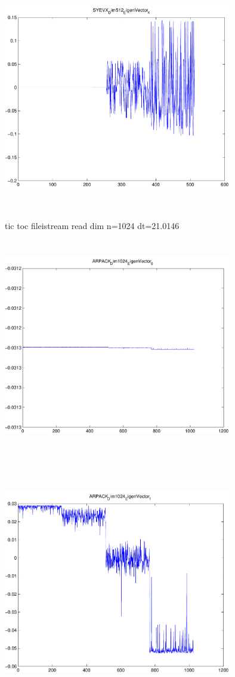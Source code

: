 \documentclass[9pt]{article}
\theoremstyle{plain}
\theoremstyle{definition}
\theoremstyle{remark}
\numberwithin{equation}{section}
\begin{document}
\includegraphics[width=10.0cm,height=10.0cm]{SYEVX_Dim512_EigenVector_4.pdf}

tic toc fileistream read dim n=1024 dt=21.0146
\includegraphics[width=10.0cm,height=10.0cm]{ARPACK_Dim1024_EigenVector_0.pdf}

\includegraphics[width=10.0cm,height=10.0cm]{ARPACK_Dim1024_EigenVector_1.pdf}
\end{document}
